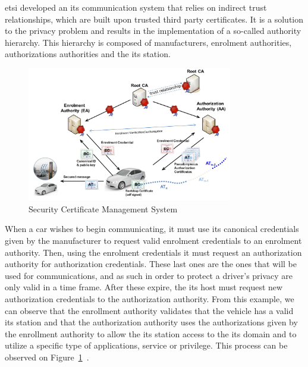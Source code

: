 \gls{etsi} developed an \gls{its} communication system that relies on indirect trust relationships, which are built upon trusted third party certificates. It is a solution to the privacy problem and results in the implementation of a so-called authority hierarchy. This hierarchy is composed of manufacturers, enrolment authorities, authorizations authorities and the \gls{its} station.

\begin{figure}[htbp]
    \centering
    \includegraphics[width=0.8\textwidth]{Chapters/Figures/VANETs/pki.png}
   	\caption{ Security Certificate Management System~\cite{etsi_intelligent_2018}}
   	\label{fig:pki}
\end{figure}


When a car wishes to begin communicating, it must use its canonical credentials given by the manufacturer to request valid enrolment credentials to an enrolment authority. Then, using the enrolment credentials it must request an authorization authority for authorization credentials. These last ones are the ones that will be used for communications, and as such in order to protect a driver's privacy are only valid in a time frame. After these expire, the \gls{its} host must request new authorization credentials to the authorization authority.
From this example, we can observe that the enrollment authority validates that the vehicle has a valid \gls{its} station and that the authorization authority uses the authorizations given by the enrollment authority to allow the \gls{its} station access to the \gls{its} domain and to utilize a specific type of applications, service or privilege. This process can be observed on Figure~\ref{fig:pki}~\cite{etsi_intelligent_2021}.



